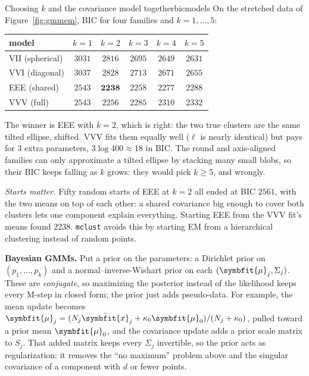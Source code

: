 \documentclass[11pt]{article}
\newcommand{\bm}[1]{\symbfit{#1}}
\newcommand{\vx}{\bm{x}}
\begin{document}
\begin{example}{Choosing $k$ and the covariance model together}{bicmodels}
On the stretched data of Figure~\ref{fig:gmmem}, BIC for four families and $k=1,\dots,5$:
\begin{center}
\small
\begin{tabular}{@{}lccccc@{}}
\toprule
model & $k=1$ & $k=2$ & $k=3$ & $k=4$ & $k=5$ \\
\midrule
VII (spherical) & $3031$ & $2816$ & $2695$ & $2649$ & $2631$ \\
VVI (diagonal) & $3037$ & $2828$ & $2713$ & $2671$ & $2655$ \\
EEE (shared) & $2543$ & $\mathbf{2238}$ & $2258$ & $2277$ & $2288$ \\
VVV (full) & $2543$ & $2256$ & $2285$ & $2310$ & $2332$ \\
\bottomrule
\end{tabular}
\end{center}
The winner is EEE with $k=2$, which is right: the two true clusters are the same tilted ellipse, shifted. VVV fits them equally well ($\ell$ is nearly identical) but pays for $3$ extra parameters, $3\log400\approx18$ in BIC. The round and axis-aligned families can only approximate a tilted ellipse by stacking many small blobs, so their BIC keeps falling as $k$ grows: they would pick $k\ge5$, and wrongly.

\emph{Starts matter.} Fifty random starts of EEE at $k=2$ all ended at BIC $2561$, with the two means on top of each other: a shared covariance big enough to cover both clusters lets one component explain everything. Starting EEE from the VVV fit's means found $2238$. \texttt{mclust} avoids this by starting EM from a hierarchical clustering instead of random points.
\end{example}

\textbf{Bayesian GMMs.} Put a prior on the parameters: a Dirichlet prior on $(p_1,\dots,p_k)$ and a normal--inverse-Wishart prior on each $(\bm\mu_j,\Sigma_j)$. These are \emph{conjugate}, so maximizing the posterior instead of the likelihood keeps every M-step in closed form; the prior just adds pseudo-data. For example, the mean update becomes $\bm\mu_j=(N_j\bar{\vx}_j+\kappa_0\bm\mu_0)/(N_j+\kappa_0)$, pulled toward a prior mean $\bm\mu_0$, and the covariance update adds a prior scale matrix to $S_j$. That added matrix keeps every $\Sigma_j$ invertible, so the prior acts as regularization: it removes the ``no maximum'' problem above and the singular covariance of a component with $d$ or fewer points.
\end{document}
